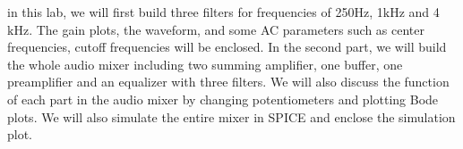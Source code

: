 in this lab, we will first build three filters for frequencies of 250$ \si{\hertz} $, 1$ \si{\kilo\hertz} $ and 4$ \si{\kilo\hertz} $. The gain plots, the waveform, and some AC parameters such as center frequencies, cutoff frequencies will be enclosed. In the second part, we will build the whole audio mixer including two summing amplifier, one buffer, one preamplifier and an equalizer with three filters. We will also discuss the function of each part in the audio mixer by changing potentiometers and plotting Bode plots. We will also simulate the entire mixer in SPICE and enclose the simulation plot.
